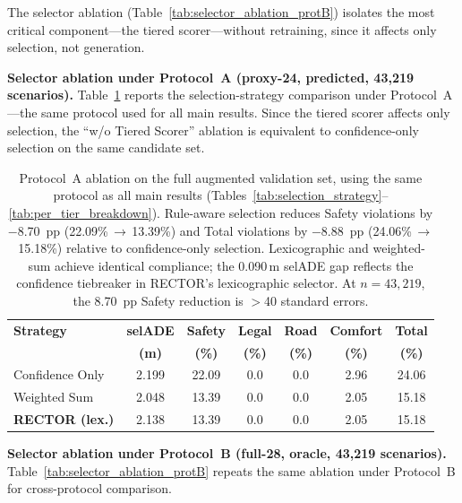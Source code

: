 The selector ablation (Table~\ref{tab:selector_ablation_protB}) isolates the most critical component---the tiered scorer---without retraining, since it affects only selection, not generation.

\noindent\textbf{Selector ablation under Protocol~A (proxy-24, predicted, 43{,}219 scenarios).}
Table~\ref{tab:selector_ablation_protA} reports the selection-strategy comparison under Protocol~A---the same protocol used for all main results.  Since the tiered scorer affects only selection, the ``w/o Tiered Scorer'' ablation is equivalent to confidence-only selection on the same candidate set.

\begin{table}[t]
\centering
\caption{Selector Ablation under Protocol~A (Proxy-24, Predicted, 43{,}219 Scenarios, Current Checkpoint)}
\label{tab:selector_ablation_protA}
\setlength{\tabcolsep}{3pt}
\begin{tabular}{lcccccc}
\toprule
\textbf{Strategy} & \textbf{selADE} & \textbf{Safety} & \textbf{Legal} & \textbf{Road} & \textbf{Comfort} & \textbf{Total} \\
 & \textbf{(m)} & \textbf{(\%)} & \textbf{(\%)} & \textbf{(\%)} & \textbf{(\%)} & \textbf{(\%)} \\
\midrule
Confidence Only & 2.199 & 22.09 & 0.0 & 0.0 & 2.96 & 24.06 \\
Weighted Sum & 2.048 & 13.39 & 0.0 & 0.0 & 2.05 & 15.18 \\
\textbf{RECTOR (lex.)} & 2.138 & 13.39 & 0.0 & 0.0 & 2.05 & 15.18 \\
\bottomrule
\end{tabular}
\vspace{1mm}
\caption*{\footnotesize Protocol~A ablation on the full augmented validation set, using the same protocol as all main results (Tables~\ref{tab:selection_strategy}--\ref{tab:per_tier_breakdown}).  Rule-aware selection reduces Safety violations by $-$8.70~pp (22.09\%\,$\to$\,13.39\%) and Total violations by $-$8.88~pp (24.06\%\,$\to$\,15.18\%) relative to confidence-only selection.  Lexicographic and weighted-sum achieve identical compliance; the 0.090\,m selADE gap reflects the confidence tiebreaker in RECTOR's lexicographic selector.  At $n{=}43{,}219$, the 8.70~pp Safety reduction is $>$40 standard errors.}
\end{table}

\noindent\textbf{Selector ablation under Protocol~B (full-28, oracle, 43{,}219 scenarios).}
Table~\ref{tab:selector_ablation_protB} repeats the same ablation under Protocol~B for cross-protocol comparison.

